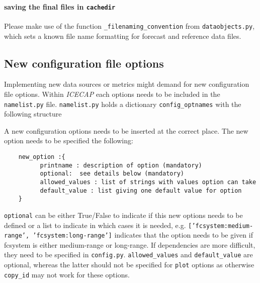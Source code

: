 \documentclass[DIV=10, parskip=full]{scrreprt}
\newcommand{\ice}{\textit{ICECAP}\xspace}
\begin{document}
\paragraph{saving the final files in \texttt{cachedir}}
Please make use of the function \texttt{\_filenaming\_convention} from  \texttt{dataobjects.py}, which sets a known file name formatting for forecast and reference data files. 


\subsection{New configuration file options}
Implementing new data sources or metrics might demand for new configuration file options. Within \ice each options needs to be included in the \texttt{namelist.py} file.   \texttt{namelist.py} holds a dictionary \texttt{config\_optnames} with the following structure\\


A new configuration options needs to be inserted at the correct place. The new option needs to be specified the following:\\
\begin{verbatim}
	new_option :{
	      printname : description of option (mandatory)
	      optional:  see details below (mandatory)
	      allowed_values : list of strings with values option can take
	      default_value : list giving one default value for option
	}
\end{verbatim}

\texttt{optional} can be either True/False to indicate if this new options needs to be defined or a list to indicate in which cases it is needed, e.g. \texttt{['fcsystem:medium-range', 'fcsystem:long-range']} indicates that the option needs to be given if fcsystem is either medium-range or long-range. If dependencies are more difficult, they need to be specified in \texttt{config.py}. \texttt{allowed\_values} and \texttt{default\_value} are optional, whereas the latter should not be specified for \texttt{plot} options as otherwise \texttt{copy\_id} may not work for these options.\\
\end{document}
